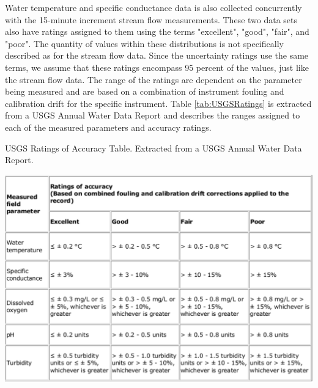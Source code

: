 \begin{linenumbers}
Water temperature and specific conductance data is also collected concurrently with the 15-minute increment stream flow measurements.  These two data sets also have ratings assigned to them using the terms "excellent", "good", "fair", and "poor".  The quantity of values within these distributions is not specifically described as for the stream flow data.  Since the uncertainty ratings use the same terms, we assume that these ratings encompass 95 percent of the values, just like the stream flow data.  The range of the ratings are dependent on the parameter being measured and are based on a combination of instrument fouling and calibration drift for the specific instrument.  Table \ref{tab:USGSRatings} is extracted from a USGS Annual Water Data Report and describes the ranges assigned to each of the measured parameters and accuracy ratings.
\begin{table}[htbp]
\begin{center}
	\caption[USGS Ratings of Accuracy Table.]{USGS Ratings of Accuracy Table.  Extracted from a USGS Annual Water Data Report.}
	\label{tab:USGSRatings}
	\includegraphics[width=6in]{"Figures/USGS_error_table"}
\end{center}
\end{table}


\end{linenumbers}
